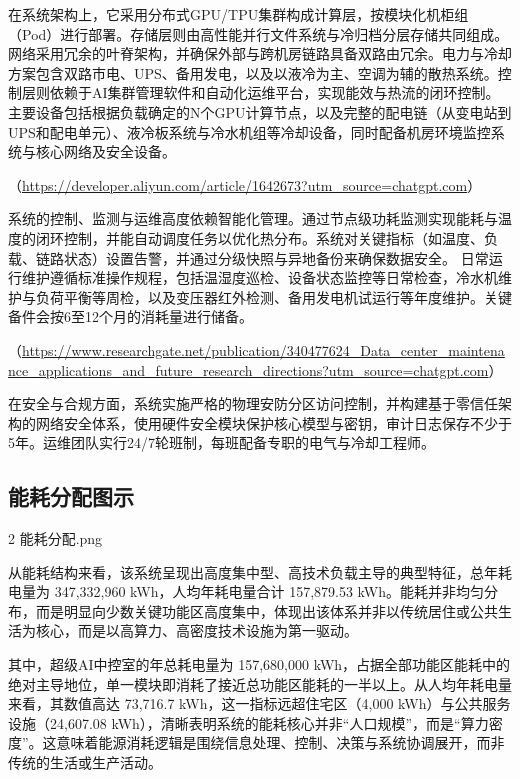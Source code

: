 在系统架构上，它采用分布式GPU/TPU集群构成计算层，按模块化机柜组（Pod）进行部署。存储层则由高性能并行文件系统与冷归档分层存储共同组成。网络采用冗余的叶脊架构，并确保外部与跨机房链路具备双路由冗余。电力与冷却方案包含双路市电、UPS、备用发电，以及以液冷为主、空调为辅的散热系统。控制层则依赖于AI集群管理软件和自动化运维平台，实现能效与热流的闭环控制。 主要设备包括根据负载确定的N个GPU计算节点，以及完整的配电链（从变电站到UPS和配电单元）、液冷板系统与冷水机组等冷却设备，同时配备机房环境监控系统与核心网络及安全设备。

（\url{https://developer.aliyun.com/article/1642673?utm\_source=chatgpt.com}）

系统的控制、监测与运维高度依赖智能化管理。通过节点级功耗监测实现能耗与温度的闭环控制，并能自动调度任务以优化热分布。系统对关键指标（如温度、负载、链路状态）设置告警，并通过分级快照与异地备份来确保数据安全。 日常运行维护遵循标准操作规程，包括温湿度巡检、设备状态监控等日常检查，冷水机维护与负荷平衡等周检，以及变压器红外检测、备用发电机试运行等年度维护。关键备件会按6至12个月的消耗量进行储备。

（\url{https://www.researchgate.net/publication/340477624\_Data\_center\_maintenance\_applications\_and\_future\_research\_directions?utm\_source=chatgpt.com}）

在安全与合规方面，系统实施严格的物理安防分区访问控制，并构建基于零信任架构的网络安全体系，使用硬件安全模块保护核心模型与密钥，审计日志保存不少于5年。运维团队实行24/7轮班制，每班配备专职的电气与冷却工程师。

\subsection{能耗分配图示}\label{ux80fdux8017ux5206ux914dux56feux793a}

2 能耗分配.png

从能耗结构来看，该系统呈现出高度集中型、高技术负载主导的典型特征，总年耗电量为 347,332,960 kWh，人均年耗电量合计 157,879.53 kWh。能耗并非均匀分布，而是明显向少数关键功能区高度集中，体现出该体系并非以传统居住或公共生活为核心，而是以高算力、高密度技术设施为第一驱动。

其中，超级AI中控室的年总耗电量为 157,680,000 kWh，占据全部功能区能耗中的绝对主导地位，单一模块即消耗了接近总功能区能耗的一半以上。从人均年耗电量来看，其数值高达 73,716.7 kWh，这一指标远超住宅区（4,000 kWh）与公共服务设施（24,607.08 kWh），清晰表明系统的能耗核心并非``人口规模''，而是``算力密度''。这意味着能源消耗逻辑是围绕信息处理、控制、决策与系统协调展开，而非传统的生活或生产活动。

